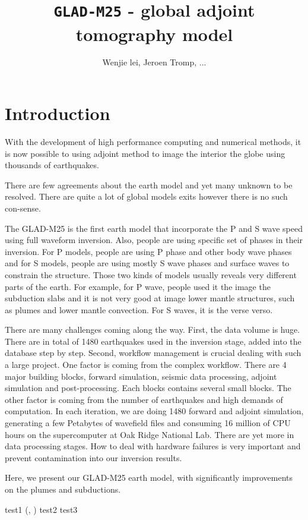 \documentclass[extra,mreferee]{gji}
\title[\texttt{gji\_extra.sty} ]
  {\texttt{GLAD-M25} - global adjoint tomography model}
\author[]  {Wenjie lei, Jeroen Tromp, ...}
\begin{document}
\maketitle

\section{Introduction}
With the development of high performance computing and numerical methods, it is now possible to using adjoint method to image the interior the globe using thousands of earthquakes.

There are few agreements about the earth model and yet many unknown to be resolved. There are quite a lot of global models exits however there is no such con-sense.

The GLAD-M25 is the first earth model that incorporate the P and S wave speed using full waveform inversion. Also, people are using specific set of phases in their inversion. For P models, people are using P phase and other body wave phases and for S models, people are using mostly S wave phases and surface waves to constrain the structure. Those two kinds of models usually reveals very different parts of the earth. For example, for P wave, people used it the image the subduction slabs and it is not very good at image lower mantle structures, such as plumes and lower mantle convection. For S waves, it is the verse verso.

There are many challenges coming along the way. First, the data volume is huge.  There are in total of 1480 earthquakes used in the inversion stage, added into the database step by step. Second, workflow management is crucial dealing with such a large project. One factor is coming from the complex workflow. There are 4 major building blocks, forward simulation, seismic data processing, adjoint simulation and post-processing. Each blocks contains several small blocks. The other factor is coming from the number of earthquakes and high demands of computation. In each iteration, we are doing 1480 forward and adjoint simulation, generating a few Petabytes of wavefield files and consuming 16 million of CPU hours on the supercomputer at Oak Ridge National Lab. There are yet more in data processing stages. How to deal with hardware failures is very important and prevent contamination into our inversion results.

Here, we present our GLAD-M25 earth model, with significantly improvements on the plumes and subductions.

test1 (\cite{zhu2012structure}, \cite{zhu2012structure})
test2 \citep{zhu2015seismic, ekstrom2012global}
test3 \citet{ekstrom2012global}
\end{document}
